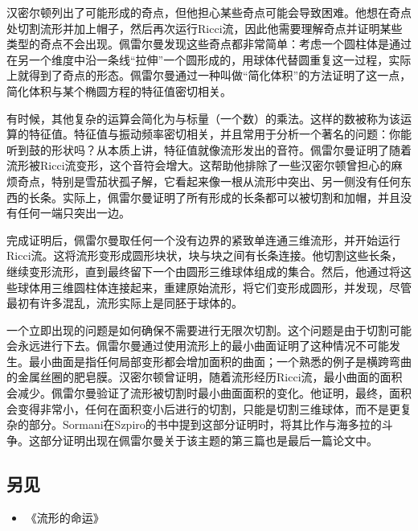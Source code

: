 汉密尔顿列出了可能形成的奇点，但他担心某些奇点可能会导致困难。他想在奇点处切割流形并加上帽子，然后再次运行Ricci流，因此他需要理解奇点并证明某些类型的奇点不会出现。佩雷尔曼发现这些奇点都非常简单：考虑一个圆柱体是通过在另一个维度中沿一条线“拉伸”一个圆形成的，用球体代替圆重复这一过程，实际上就得到了奇点的形态。佩雷尔曼通过一种叫做“简化体积”的方法证明了这一点，简化体积与某个椭圆方程的特征值密切相关。

有时候，其他复杂的运算会简化为与标量（一个数）的乘法。这样的数被称为该运算的特征值。特征值与振动频率密切相关，并且常用于分析一个著名的问题：你能听到鼓的形状吗？从本质上讲，特征值就像流形发出的音符。佩雷尔曼证明了随着流形被Ricci流变形，这个音符会增大。这帮助他排除了一些汉密尔顿曾担心的麻烦奇点，特别是雪茄状孤子解，它看起来像一根从流形中突出、另一侧没有任何东西的长条。实际上，佩雷尔曼证明了所有形成的长条都可以被切割和加帽，并且没有任何一端只突出一边。

完成证明后，佩雷尔曼取任何一个没有边界的紧致单连通三维流形，并开始运行Ricci流。这将流形变形成圆形块状，块与块之间有长条连接。他切割这些长条，继续变形流形，直到最终留下一个由圆形三维球体组成的集合。然后，他通过将这些球体用三维圆柱体连接起来，重建原始流形，将它们变形成圆形，并发现，尽管最初有许多混乱，流形实际上是同胚于球体的。

一个立即出现的问题是如何确保不需要进行无限次切割。这个问题是由于切割可能会永远进行下去。佩雷尔曼通过使用流形上的最小曲面证明了这种情况不可能发生。最小曲面是指任何局部变形都会增加面积的曲面；一个熟悉的例子是横跨弯曲的金属丝圈的肥皂膜。汉密尔顿曾证明，随着流形经历Ricci流，最小曲面的面积会减少。佩雷尔曼验证了流形被切割时最小曲面面积的变化。他证明，最终，面积会变得非常小，任何在面积变小后进行的切割，只能是切割三维球体，而不是更复杂的部分。Sormani在Szpiro的书中提到这部分证明时，将其比作与海多拉的斗争。这部分证明出现在佩雷尔曼关于该主题的第三篇也是最后一篇论文中。
\subsection{另见}  
\begin{itemize}
\item 《流形的命运》 
\end{itemize} 
